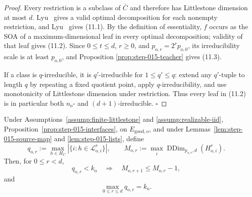 \begin{proof}
Every restriction is a subclass of \(\bar C\) and therefore has
Littlestone dimension at most \(d\).
Lyu~\citep[Claim~4.1 and Definition~4.3]{lyu2025} gives a valid optimal
decomposition for each nonempty restriction, and
Lyu~\citep[Lemma~4.1 and Corollary~4.1]{lyu2025} gives (11.1). By the
definition of essentiality, \(f\) occurs as the SOA of a
maximum-dimensional leaf in every optimal decomposition; validity of that
leaf gives (11.2). Since \(0\le t\le d\), \(r\ge0\), and
\(p_{\mathrm o,r}=2^rp_{\mathrm o,0}\), its irreducibility scale is at
least \(p_{\mathrm o,0}\), and Proposition
\ref{prop:step-015-teacher} gives (11.3).

If a class is \(q\)-irreducible, it is \(q'\)-irreducible for
\(1\le q'\le q\): extend any \(q'\)-tuple to length \(q\) by repeating a
fixed quotient point, apply \(q\)-irreducibility, and use monotonicity of
Littlestone dimension under restriction. Thus every leaf in (11.2) is in
particular both \(n_{\mathrm o}\)- and \((d+1)\)-irreducible. \(\square\)


\end{proof}

\begin{proposition}\label{prop:step-015-descent}
Under Assumptions~\ref{assump:finite-littlestone} and
\ref{assump:realizable-iid},
Proposition~\ref{prop:step-015-interfaces}, on \(E_{\mathrm{good,o}}\), and under
Lemmas~\ref{lem:step-015-source-map} and
\ref{lem:step-015-lists}, define
\[
q_{\mathrm o,r}:=
\max_{h\in H_C}|\{i:h\in\mathcal L_{\mathrm o,i}^r\}|,
\qquad
M_{\mathrm o,r}:=
\max_i\operatorname{DDim}_{p_{\mathrm o,r},d}
(H_{\mathrm o,i}^r).
\tag{12.1}
\]
Then, for \(0\le r<d\),
\[
q_{\mathrm o,r}<k_{\mathrm o}
\quad\Longrightarrow\quad
M_{\mathrm o,r+1}\le M_{\mathrm o,r}-1,
\tag{12.2}
\]
and
\[
\max_{0\le r\le d}q_{\mathrm o,r}=k_{\mathrm o}.
\tag{12.3}
\]


\end{proposition}

